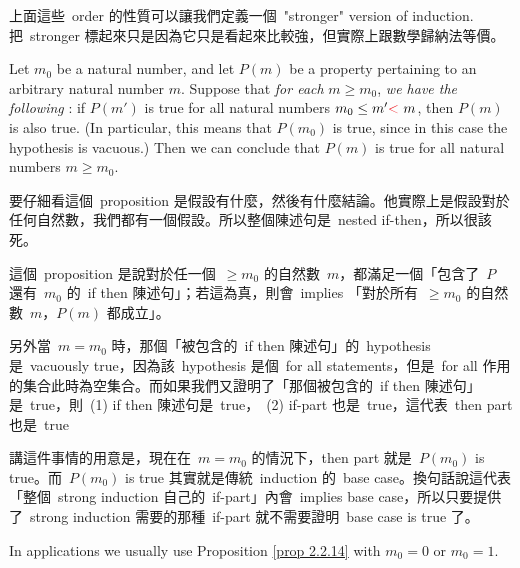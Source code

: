 \begin{note}
上面這些\ order 的性質可以讓我們定義一個\ "stronger" version of induction. 把\ stronger 標起來只是因為它只是看起來比較強，但實際上跟數學歸納法等價。
\end{note}

\begin{proposition} \label{prop 2.2.14}
Let \(m_0\) be a natural number, and let \(P(m)\) be a property pertaining to an arbitrary natural number \(m\). Suppose that \emph{for each} \(m \geq m_0\), \emph{we have the following } : if \(P(m')\) is true for all natural numbers \(m_0 \leq m' \RED{<}\ m\), then \(P(m)\) is also true. (In particular, this means that \(P(m_0)\) is true, since in this case the hypothesis is vacuous.) Then we can conclude that \(P(m)\) is true for all natural numbers \(m \geq m_0\).
\end{proposition}
\begin{note}
要仔細看這個\ proposition 是假設有什麼，然後有什麼結論。他實際上是假設對於任何自然數，我們都有一個假設。所以整個陳述句是\ nested if-then，所以很該死。

這個\ proposition 是說對於任一個\ \(\geq m_0\) 的自然數\ \(m\)，都滿足一個「包含了\ \(P\) 還有\ \(m_0\) 的\ if then 陳述句」；若這為真，則會\ implies 「對於所有\ \(\geq m_0\) 的自然數\ 
\(m\)，\(P(m)\) 都成立」。

另外當\ \(m = m_0\) 時，那個「被包含的\ if then 陳述句」的\ hypothesis 是\ vacuously true，因為該\ hypothesis 是個\ for all statements，但是\ for all 作用的集合此時為空集合。而如果我們又證明了「那個被包含的\ if then 陳述句」是\ true，則\ (1) if then 陳述句是\ true，\ (2) if-part 也是\ true，這代表\ then part 也是\ true

講這件事情的用意是，現在在\ \(m = m_0\) 的情況下，then part 就是\ \(P(m_0)\) is true。而\ \(P(m_0)\) is true 其實就是傳統\ induction 的\ base case。換句話說這代表「整個\ strong induction 自己的\ if-part」內會\ implies base case，所以只要提供了\ strong induction 需要的那種\ if-part 就不需要證明\ base case is true 了。
\end{note}

\begin{remark}\label{remark 2.2.15}
In applications we usually use Proposition \ref{prop 2.2.14} with \(m_0 = 0\) or \(m_0 = 1\).
\end{remark}

